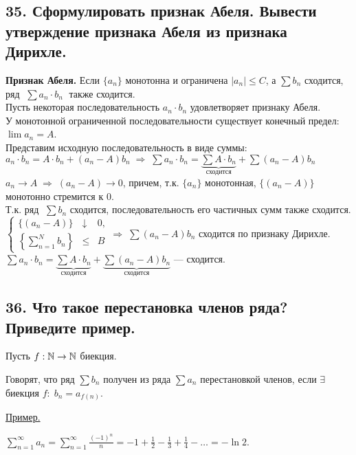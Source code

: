 \documentclass[a4paper, fleqn]{article}
\begin{document}
    \subsection*{35. Сформулировать признак Абеля. Вывести утверждение признака Абеля из признака Дирихле.}
	\textbf{Признак Абеля. } Если $\{ a_n \}$ монотонна и ограничена $|a_n| \le C$, а $\sum b_n$ сходится,
	ряд $\; \sum a_n \cdot b_n \;$ также сходится.\\[5 pt]
	Пусть некоторая последовательность $a_n \cdot b_n$ удовлетворяет признаку Абеля. \\[3 pt]
	У монотонной ограниченной последовательности существует конечный предел: $\lim a_n = A$. \\[3 pt]
	Представим исходную последовательность в виде суммы: \\[3 pt]
	$a_n \cdot b_n = A \cdot b_n + (a_n - A) b_n \; \Rightarrow \; 
	\sum a_n \cdot b_n = \underbrace{\sum A \cdot b_n}_{\text{сходится}} + \sum (a_n - A) b_n$ \\[3 pt]
	$a_n \to A \; \Rightarrow \; (a_n - A) \to 0$, причем, т.к. $\{ a_n \}$ монотонная, $\{ (a_n - A) \}$ монотонно стремится к 0. \\[3 pt]
	Т.к. ряд $\;\sum b_n$ сходится, последовательность его частичных сумм также сходится. \\[3 pt]
	$\left\{\begin{array}{lll} 
	\{ (a_n - A) \} &\downarrow& 0,\\[10 pt]
	\left\{ \sum\limits_{n=1}^N b_n \right\} &\le& B
	\end{array}\right. \Rightarrow \; \sum (a_n - A) b_n$ сходится по признаку Дирихле.\\[3 pt]
	$\sum a_n \cdot b_n = \underbrace{\sum A \cdot b_n}_{\text{сходится}} +\underbrace{\sum (a_n - A) b_n}_{\text{сходится}}$ --- сходится.    
    
    \subsection*{36. Что такое перестановка членов ряда? Приведите пример.}
    
    Пусть $f: \mathbb{N} \to \mathbb{N}$ биекция.
    
    Говорят, что ряд $\sum b_n$ получен из ряда $\sum a_n$ перестановкой членов, если $\exists$ биекция $f: \; b_n = a_{f(n)}.$ 
    
    \underline{Пример.}
    
    $\displaystyle \sum_{n = 1}^{\infty} a_n = \sum_{n = 1}^{\infty} \frac{(-1)^n}{n} = -1 + \frac{1}{2} - \frac{1}{3} + \frac{1}{4} - \dots = -\ln 2.$
    
\end{document}
